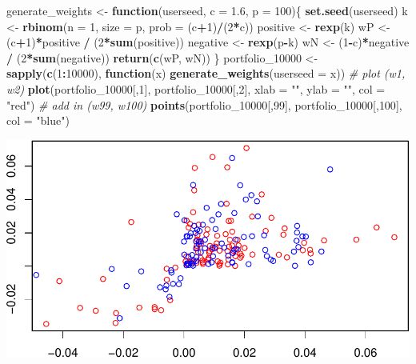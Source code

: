 \documentclass[11pt,]{article}
\newenvironment{Shaded}{\begin{snugshade}}{\end{snugshade}}
\newcommand{\CommentTok}[1]{\textcolor[rgb]{0.56,0.35,0.01}{\textit{#1}}}
\newcommand{\ControlFlowTok}[1]{\textcolor[rgb]{0.13,0.29,0.53}{\textbf{#1}}}
\newcommand{\DataTypeTok}[1]{\textcolor[rgb]{0.13,0.29,0.53}{#1}}
\newcommand{\DecValTok}[1]{\textcolor[rgb]{0.00,0.00,0.81}{#1}}
\newcommand{\FloatTok}[1]{\textcolor[rgb]{0.00,0.00,0.81}{#1}}
\newcommand{\KeywordTok}[1]{\textcolor[rgb]{0.13,0.29,0.53}{\textbf{#1}}}
\newcommand{\NormalTok}[1]{#1}
\newcommand{\OperatorTok}[1]{\textcolor[rgb]{0.81,0.36,0.00}{\textbf{#1}}}
\newcommand{\StringTok}[1]{\textcolor[rgb]{0.31,0.60,0.02}{#1}}
\begin{document}
\begin{Shaded}
\begin{Highlighting}[]
\NormalTok{generate_weights <-}\StringTok{ }\ControlFlowTok{function}\NormalTok{(userseed, }\DataTypeTok{c =} \FloatTok{1.6}\NormalTok{, }\DataTypeTok{p =} \DecValTok{100}\NormalTok{)\{}
  \KeywordTok{set.seed}\NormalTok{(userseed)}
\NormalTok{  k <-}\StringTok{ }\KeywordTok{rbinom}\NormalTok{(}\DataTypeTok{n =} \DecValTok{1}\NormalTok{, }\DataTypeTok{size =}\NormalTok{ p, }\DataTypeTok{prob =}\NormalTok{ (c}\OperatorTok{+}\DecValTok{1}\NormalTok{)}\OperatorTok{/}\NormalTok{(}\DecValTok{2}\OperatorTok{*}\NormalTok{c))}
\NormalTok{  positive <-}\StringTok{ }\KeywordTok{rexp}\NormalTok{(k)}
\NormalTok{  wP <-}\StringTok{ }\NormalTok{(c}\OperatorTok{+}\DecValTok{1}\NormalTok{)}\OperatorTok{*}\NormalTok{positive }\OperatorTok{/}\StringTok{ }\NormalTok{(}\DecValTok{2}\OperatorTok{*}\KeywordTok{sum}\NormalTok{(positive)) }
\NormalTok{  negative <-}\StringTok{ }\KeywordTok{rexp}\NormalTok{(p}\OperatorTok{-}\NormalTok{k)}
\NormalTok{  wN <-}\StringTok{ }\NormalTok{(}\DecValTok{1}\OperatorTok{-}\NormalTok{c)}\OperatorTok{*}\NormalTok{negative }\OperatorTok{/}\StringTok{ }\NormalTok{(}\DecValTok{2}\OperatorTok{*}\KeywordTok{sum}\NormalTok{(negative))}
  \KeywordTok{return}\NormalTok{(}\KeywordTok{c}\NormalTok{(wP, wN)) }
\NormalTok{\}}
\NormalTok{portfolio_}\DecValTok{10000}\NormalTok{ <-}\StringTok{ }\KeywordTok{sapply}\NormalTok{(}\KeywordTok{c}\NormalTok{(}\DecValTok{1}\OperatorTok{:}\DecValTok{10000}\NormalTok{), }\ControlFlowTok{function}\NormalTok{(x) }\KeywordTok{generate_weights}\NormalTok{(}\DataTypeTok{userseed =}\NormalTok{ x)) }
\CommentTok{# plot (w1, w2)}
\KeywordTok{plot}\NormalTok{(portfolio_}\DecValTok{10000}\NormalTok{[,}\DecValTok{1}\NormalTok{], portfolio_}\DecValTok{10000}\NormalTok{[,}\DecValTok{2}\NormalTok{], }\DataTypeTok{xlab =} \StringTok{""}\NormalTok{, }\DataTypeTok{ylab =} \StringTok{""}\NormalTok{, }\DataTypeTok{col =} \StringTok{"red"}\NormalTok{)}
\CommentTok{# add in (w99, w100)}
\KeywordTok{points}\NormalTok{(portfolio_}\DecValTok{10000}\NormalTok{[,}\DecValTok{99}\NormalTok{], portfolio_}\DecValTok{10000}\NormalTok{[,}\DecValTok{100}\NormalTok{], }\DataTypeTok{col =} \StringTok{"blue"}\NormalTok{)}
\end{Highlighting}
\end{Shaded}

\includegraphics{hw4_files/figure-latex/unnamed-chunk-7-1.pdf}
\end{document}
